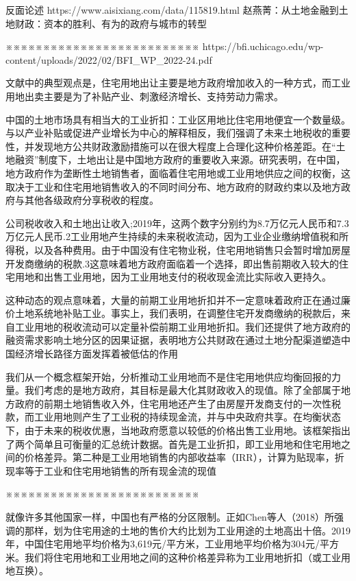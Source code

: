 反面论述
https://www.aisixiang.com/data/115819.html
赵燕菁：从土地金融到土地财政：资本的胜利、有为的政府与城市的转型

※※※※※※※※※※※※※※※※※※※※※※※※※※
https://bfi.uchicago.edu/wp-content/uploads/2022/02/BFI_WP_2022-24.pdf

文献中的典型观点是，住宅用地出让主要是地方政府增加收入的一种方式，而工业用地出卖主要是为了补贴产业、刺激经济增长、支持劳动力需求。

中国的土地市场具有相当大的工业折扣：工业区用地比住宅用地便宜一个数量级。与以产业补贴或促进产业增长为中心的解释相反，我们强调了未来土地税收的重要性，并发现地方公共财政激励措施可以在很大程度上合理化这种价格差距。在“土地融资”制度下，土地出让是中国地方政府的重要收入来源。研究表明，在中国，地方政府作为垄断性土地销售者，面临着住宅用地或工业用地供应之间的权衡，这取决于工业和住宅用地销售收入的不同时间分布、地方政府的财政约束以及地方政府与其他各级政府分享税收的程度。

公司税收收入和土地出让收入;2019年，这两个数字分别约为8.7万亿元人民币和7.3万亿元人民币.2工业用地产生持续的未来税收流动，因为工业企业缴纳增值税和所得税，以及各种费用。由于中国没有住宅物业税，住宅用地销售只会暂时增加房屋开发商缴纳的税款.3这意味着地方政府面临着一个选择，即出售前期收入较大的住宅用地和出售工业用地，因为工业用地支付的税收现金流比实际收入更持久。

这种动态的观点意味着，大量的前期工业用地折扣并不一定意味着政府正在通过廉价土地系统地补贴工业。事实上，我们表明，在调整住宅开发商缴纳的税款后，来自工业用地的税收流动可以定量补偿前期工业用地折扣。我们还提供了地方政府的融资需求影响土地分区的因果证据，表明地方公共财政在通过土地分配渠道塑造中国经济增长路径方面发挥着被低估的作用

我们从一个概念框架开始，分析推动工业用地而不是住宅用地供应均衡回报的力量。我们考虑的是地方政府，其目标是最大化其财政收入的现值。除了全部属于地方政府的前期土地销售收入外，住宅用地还产生了由房屋开发商支付的一次性税款，而工业用地则产生了工业税的持续现金流，并与中央政府共享。在均衡状态下，由于未来的税收优惠，当地政府愿意以较低的价格出售工业用地。该框架指出了两个简单且可衡量的汇总统计数据。首先是工业折扣，即工业用地和住宅用地之间的价格差异。第二种是工业用地销售的内部收益率（IRR），计算为贴现率，折现率等于工业和住宅用地销售的所有现金流的现值

※※※※※※※※※※※※※※※※※※※※※※※※※※

就像许多其他国家一样，中国也有严格的分区限制。正如Chen等人（2018）所强调的那样，划为住宅用途的土地的售价大约比划为工业用途的土地高出十倍。2019年，中国住宅用地平均价格为3,619元/平方米，工业用地平均价格为304元/平方米。我们将住宅用地和工业用地之间的这种价格差异称为工业用地折扣（或工业用地互换）。


